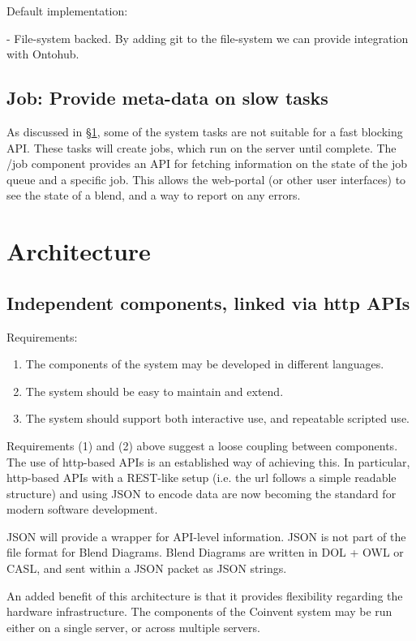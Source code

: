 \documentclass[a4paper,twoside,11pt]{article}
\begin{document}
Default implementation: 

 - File-system backed. By adding git to the file-system we can provide integration with Ontohub.

\subsection{Job: Provide meta-data on slow tasks}


As discussed in \S\ref{sec:architecture}, some of the system tasks are not suitable for
a fast blocking API. These tasks will create jobs, which run on the server until complete.
The /job component provides an API for fetching information on the state of the job queue and a specific job. This allows the web-portal (or other user interfaces) to see the state of a blend, and a way to
report on any errors.

\section{Architecture}\label{sec:architecture}

\subsection{Independent components, linked via http APIs}

Requirements:  
\begin{enumerate}
\item The components of the system may be developed in different languages.
\item The system should be easy to maintain and extend.
\item The system should support both interactive use, and repeatable scripted use.
\end{enumerate}
Requirements (1) and (2) above suggest a loose coupling between components. The use of http-based APIs is an established way of achieving this. In particular, http-based APIs with a REST-like setup (i.e. the url follows a simple readable structure) and using JSON to encode data are now becoming the standard for modern software development. 

JSON will provide a wrapper for API-level information. JSON is not part of the file format for Blend Diagrams. Blend Diagrams are written in DOL + OWL or CASL, and sent within a JSON packet as JSON strings.

An added benefit of this architecture is that it provides flexibility regarding the hardware infrastructure. The components of the Coinvent system may be run either on a single server, or across multiple servers.
\end{document}
